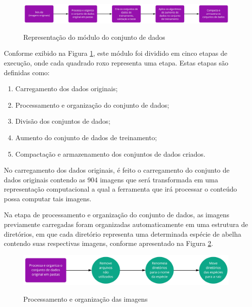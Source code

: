 \documentclass[
	12pt,				%
	oneside,			%
	a4paper,			%
	english,			%
	brazil				%
	]{abntex2ppgsi}
\begin{document}
\begin{figure}[H]
    \centering
    \caption{Representação do módulo do conjunto de dados}
    \includegraphics[width=1.0\textwidth]{imagens/materiais_metodos/modulo_conjunto_dados/pipeline_geracao_do_dataset.jpg}
    \label{fig:diagrama_modulo_do_conjunto_dados}
\end{figure}

Conforme exibido na Figura \ref{fig:diagrama_modulo_do_conjunto_dados}, este módulo foi dividido em cinco etapas de execução, onde cada quadrado roxo representa uma etapa. Estas etapas são definidas como:

\begin{enumerate}
  \item Carregamento dos dados originais;
  \item Processamento e organização do conjunto de dados;
  \item Divisão dos conjuntos de dados;
  \item Aumento do conjunto de dados de treinamento;
  \item Compactação e armazenamento dos conjuntos de dados criados.
\end{enumerate}

No carregamento dos dados originais, é feito o carregamento do conjunto de dados originais contendo as 904 imagens que será transformada em uma representação computacional a qual a ferramenta que irá processar o conteúdo possa computar tais imagens.

Na etapa de processamento e organização do conjunto de dados, as imagens previamente carregadas foram organizadas automaticamente em uma estrutura de diretórios, em que cada diretório representa uma determinada espécie de abelha contendo suas respectivas imagens, conforme apresentado na Figura \ref{fig:pipeline_geracao_do_dataset_processamento_dados}.

\begin{figure}[H]
    \centering
    \caption{Processamento e organização das imagens}
    \includegraphics[width=1.0\textwidth]{imagens/materiais_metodos/modulo_conjunto_dados/pipeline_geracao_do_dataset_processamento_dados.jpg}
    \label{fig:pipeline_geracao_do_dataset_processamento_dados}
\end{figure}
\end{document}

